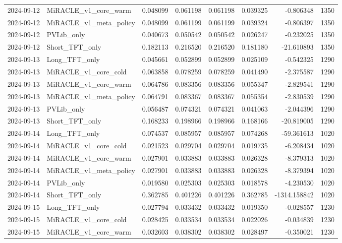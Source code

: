 \begin{tabular}{llrrrrrr}
2024-09-12 & MiRACLE_v1_core_warm & 0.048099 & 0.061198 & 0.061198 & 0.039325 & -0.806348 & 1350 \\
2024-09-12 & MiRACLE_v1_meta_policy & 0.048099 & 0.061199 & 0.061199 & 0.039324 & -0.806397 & 1350 \\
2024-09-12 & PVLib_only & 0.040673 & 0.050542 & 0.050542 & 0.026247 & -0.232025 & 1350 \\
2024-09-12 & Short_TFT_only & 0.182113 & 0.216520 & 0.216520 & 0.181180 & -21.610893 & 1350 \\
2024-09-13 & Long_TFT_only & 0.045661 & 0.052899 & 0.052899 & 0.025109 & -0.542325 & 1290 \\
2024-09-13 & MiRACLE_v1_core_cold & 0.063858 & 0.078259 & 0.078259 & 0.041490 & -2.375587 & 1290 \\
2024-09-13 & MiRACLE_v1_core_warm & 0.064786 & 0.083356 & 0.083356 & 0.055347 & -2.829541 & 1290 \\
2024-09-13 & MiRACLE_v1_meta_policy & 0.064791 & 0.083367 & 0.083367 & 0.055354 & -2.830539 & 1290 \\
2024-09-13 & PVLib_only & 0.056487 & 0.074321 & 0.074321 & 0.041063 & -2.044396 & 1290 \\
2024-09-13 & Short_TFT_only & 0.168233 & 0.198966 & 0.198966 & 0.168166 & -20.819005 & 1290 \\
2024-09-14 & Long_TFT_only & 0.074537 & 0.085957 & 0.085957 & 0.074268 & -59.361613 & 1020 \\
2024-09-14 & MiRACLE_v1_core_cold & 0.021523 & 0.029704 & 0.029704 & 0.019735 & -6.208434 & 1020 \\
2024-09-14 & MiRACLE_v1_core_warm & 0.027901 & 0.033883 & 0.033883 & 0.026328 & -8.379313 & 1020 \\
2024-09-14 & MiRACLE_v1_meta_policy & 0.027901 & 0.033883 & 0.033883 & 0.026328 & -8.379394 & 1020 \\
2024-09-14 & PVLib_only & 0.019580 & 0.025303 & 0.025303 & 0.018578 & -4.230530 & 1020 \\
2024-09-14 & Short_TFT_only & 0.362785 & 0.401226 & 0.401226 & 0.362785 & -1314.158842 & 1020 \\
2024-09-15 & Long_TFT_only & 0.027794 & 0.033432 & 0.033432 & 0.019350 & -0.028557 & 1230 \\
2024-09-15 & MiRACLE_v1_core_cold & 0.028425 & 0.033534 & 0.033534 & 0.022026 & -0.034839 & 1230 \\
2024-09-15 & MiRACLE_v1_core_warm & 0.032603 & 0.038302 & 0.038302 & 0.028497 & -0.350021 & 1230 \\

\end{tabular}
